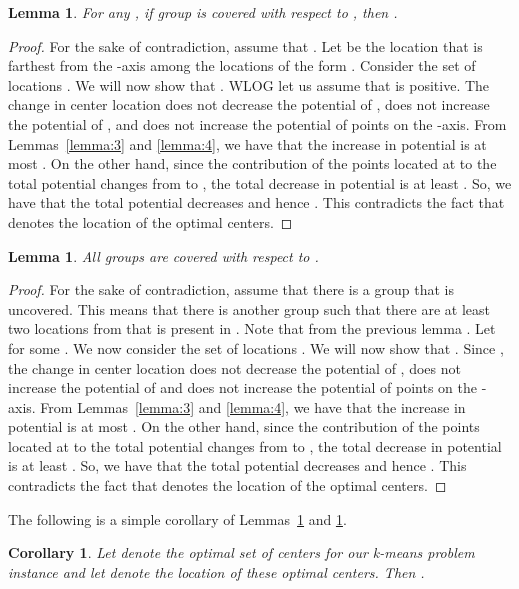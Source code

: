 \documentclass[11pt]{article}
\newtheorem{lemma}[theorem]{Lemma}
\newtheorem{corollary}[theorem]{Corollary}
\begin{document}
\begin{lemma}\label{lemma:axis}
For any , if group  is covered with respect to , then .
\end{lemma}
\begin{proof}
For the sake of contradiction, assume that . 
Let  be the location that is farthest from the -axis among the locations of the form .
Consider the set of locations .
We will now show that .
WLOG let us assume that  is positive.
The change in center location does not decrease the potential of , does not increase the potential of , and does not increase the potential of points on the -axis. 
From Lemmas~\ref{lemma:3} and \ref{lemma:4}, we have that the increase in potential is at most . 
On the other hand, since the contribution of the points located at  to the total potential changes from  to , the total decrease in potential is at least . 
So, we have that the total potential decreases and hence . 
This contradicts the fact that  denotes the location of the optimal centers.
\end{proof}

\begin{lemma}\label{lemma:distributed}
All groups are covered with respect to .
\end{lemma}
\begin{proof}
For the sake of contradiction, assume that there is a group  that is uncovered. 
This means that there is another group  such that there are at least two locations from  that is present in .
Note that from the previous lemma .
Let  for some .
We now consider the set of locations .
We will now show that .
Since , the change in center location does not decrease the potential of , does not increase the potential of  and does not increase the potential of points on the -axis. 
From Lemmas~\ref{lemma:3} and \ref{lemma:4}, we have that the increase in potential is at most . On the other hand, since the contribution of the points located at  to the total potential changes from  to , the total decrease in potential is at least . 
So, we have that the total potential decreases and hence . This contradicts the fact that  denotes the location of the optimal centers.
\end{proof}

The following is a simple corollary of Lemmas~\ref{lemma:axis} and \ref{lemma:distributed}.

\begin{corollary}
Let  denote the optimal set of centers for our k-means problem instance and let  denote the location of these optimal centers. Then .
\end{corollary}
\end{document}

